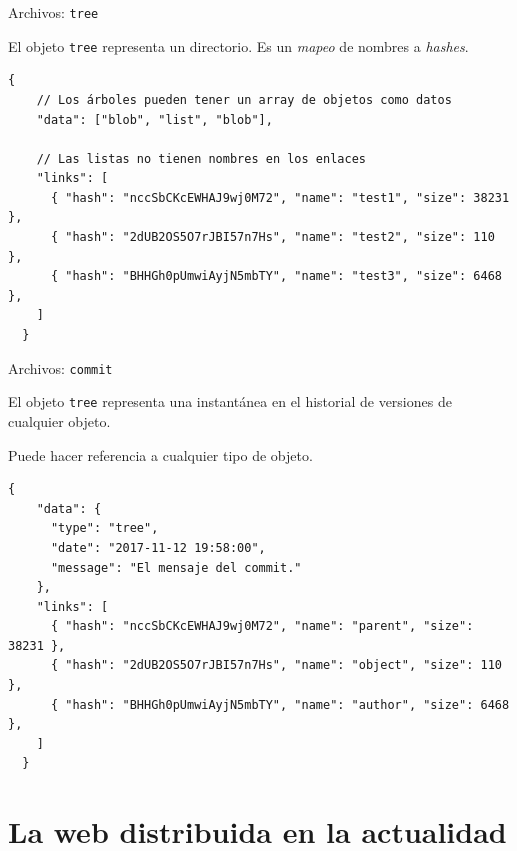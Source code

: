 \documentclass[spanish]{beamer}
\begin{document}
\begin{frame}[fragile]{Archivos: \texttt{tree}}

  El objeto \texttt{tree} representa un directorio. Es un \textit{mapeo} de nombres a \textit{hashes}.
  
  \begin{lstlisting}[caption={Estructura JSON de un \texttt{tree}.}]
  {
    // Los árboles pueden tener un array de objetos como datos
    "data": ["blob", "list", "blob"],

    // Las listas no tienen nombres en los enlaces
    "links": [
      { "hash": "nccSbCKcEWHAJ9wj0M72", "name": "test1", "size": 38231 },
      { "hash": "2dUB2OS5O7rJBI57n7Hs", "name": "test2", "size": 110 },
      { "hash": "BHHGh0pUmwiAyjN5mbTY", "name": "test3", "size": 6468 },
    ]
  }
\end{lstlisting}

\end{frame}

\begin{frame}[fragile]{Archivos: \texttt{commit}}

  El objeto \texttt{tree} representa una instantánea en el historial de versiones de cualquier objeto.

  Puede hacer referencia a cualquier tipo de objeto.
  
  \begin{lstlisting}[caption={Estructura JSON de un \texttt{commit}.}]
  {
    "data": {
      "type": "tree",
      "date": "2017-11-12 19:58:00",
      "message": "El mensaje del commit."
    },
    "links": [
      { "hash": "nccSbCKcEWHAJ9wj0M72", "name": "parent", "size": 38231 },
      { "hash": "2dUB2OS5O7rJBI57n7Hs", "name": "object", "size": 110 },
      { "hash": "BHHGh0pUmwiAyjN5mbTY", "name": "author", "size": 6468 },
    ]
  }
\end{lstlisting}

\end{frame}





\section{La web distribuida en la actualidad} %
\label{sec:la_web_distribuida_en_la_actualidad}

\end{document}
